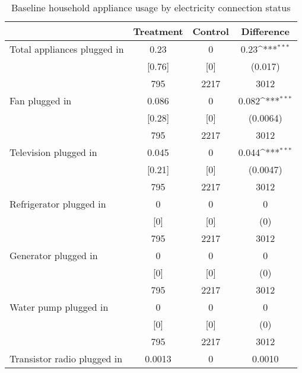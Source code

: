 \begin{table}[htbp]\centering
\def\sym#1{\ifmmode^{#1}\else\(^{#1}\)\fi}
\caption{Baseline household appliance usage by electricity connection status \label{tab:"balance"}}
\begin{tabular*}{0.9\hsize}{@{\hskip\tabcolsep\extracolsep\fill}l*{1}{ccc}}
\toprule
                                &Treatment&  Control&Difference         \\
\midrule
Total appliances plugged in     &     0.23&        0&     0.23\sym{***}\\
                                &   [0.76]&      [0]&  (0.017)         \\
                                &      795&     2217&     3012         \\
Fan plugged in                  &    0.086&        0&    0.082\sym{***}\\
                                &   [0.28]&      [0]& (0.0064)         \\
                                &      795&     2217&     3012         \\
Television plugged in           &    0.045&        0&    0.044\sym{***}\\
                                &   [0.21]&      [0]& (0.0047)         \\
                                &      795&     2217&     3012         \\
Refrigerator plugged in         &        0&        0&        0         \\
                                &      [0]&      [0]&      (0)         \\
                                &      795&     2217&     3012         \\
Generator plugged in            &        0&        0&        0         \\
                                &      [0]&      [0]&      (0)         \\
                                &      795&     2217&     3012         \\
Water pump plugged in           &        0&        0&        0         \\
                                &      [0]&      [0]&      (0)         \\
                                &      795&     2217&     3012         \\
Transistor radio plugged in     &   0.0013&        0&   0.0010         \\

\end{tabular*}
\end{table}
